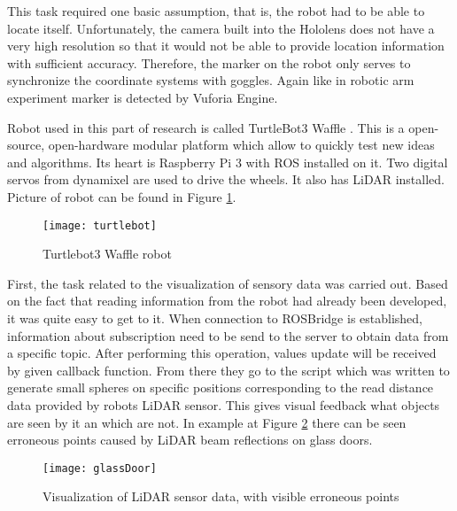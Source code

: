 \documentclass[printmode,en]{mgr}
\begin{document}
This task required one basic assumption, that is, the robot had to be able to locate itself. Unfortunately, the camera built into the Hololens does not have a very high resolution so that it would not be able to provide location information with sufficient accuracy. Therefore, the marker on the robot only serves to synchronize the coordinate systems with goggles. Again like in robotic arm experiment marker is detected by Vuforia Engine.

Robot used in this part of research is called TurtleBot3 Waffle \cite{turtlebot}. This is a open-source, open-hardware modular platform which allow to quickly test new ideas and algorithms. Its heart is Raspberry Pi 3 with ROS installed on it. Two digital servos from dynamixel are used to drive the wheels. It also has LiDAR installed. Picture of robot can be found in Figure \ref{fig:turtlebot}.

\begin{figure}[!ht]
  \centering
    \texttt{[image: turtlebot]}
  \caption{Turtlebot3 Waffle robot}
  \label{fig:turtlebot}
\end{figure}

First, the task related to the visualization of sensory data was carried out. Based on the fact that reading information from the robot had already been developed, it was quite easy to get to it. When connection to ROSBridge is established, information about subscription need to be send to the server to obtain data from a specific topic. After performing this operation, values update will be received by given callback function. From there they go to the script which was written to generate small spheres on specific positions corresponding to the read distance data provided by robots LiDAR sensor. This gives visual feedback what objects are seen by it an which are not. In example at Figure \ref{fig:glassDoor} there can be seen erroneous points caused by LiDAR beam reflections on glass doors.

\begin{figure}[!ht]
  \centering
    \texttt{[image: glassDoor]}
  \caption{Visualization of LiDAR sensor data, with visible erroneous points}
  \label{fig:glassDoor}
\end{figure}
\end{document}

